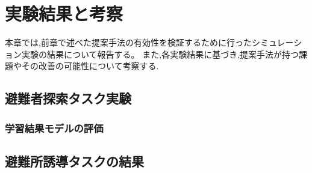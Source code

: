 \chapter{実験結果と考察}
本章では,前章で述べた提案手法の有効性を検証するために行ったシミュレーション実験の結果について報告する。
また,各実験結果に基づき,提案手法が持つ課題やその改善の可能性について考察する.

\section{避難者探索タスク実験}
\subsection{学習結果モデルの評価}

\section{避難所誘導タスクの結果}

